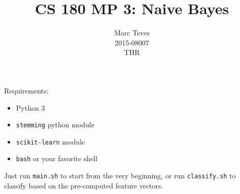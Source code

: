 \documentclass{article}
\begin{document}
	\title{CS 180 MP 3: Naive Bayes}
	\author{Marc Teves\\ 2015-08007\\ THR}
	\maketitle


	Requirements:
	\begin{itemize}
		\item Python 3
		\item \texttt{stemming} python module
		\item \texttt{scikit-learn} module
		\item \texttt{bash} or your favorite shell
	\end{itemize}

	Just run \texttt{main.sh} to start from the very beginning, or run
	\texttt{classify.sh} to classify based on the pre-computed feature vectors.
\end{document}
